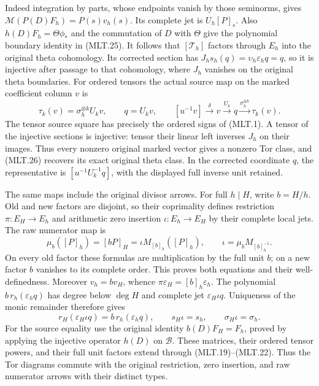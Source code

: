Indeed integration by parts, whose endpoints
vanish by those seminorms, gives
\(\mathcal M(P(D)F_h)=P(s)v_h(s)\).
Its complete jet is \(U_h[P]_s\).
Also \(h(D)F_h=\Theta\phi_*\) and the
commutation of \(D\) with \(\Theta\) give
the polynomial boundary identity in (MLT.25).
It follows that \([\mathcal T_h]\) factors
through \(E_h\) into the original theta
cohomology. Its corrected section has
\(J_hs_h(q)=\upsilon_h\varepsilon_hq=q\),
so it is injective after passage to that
cohomology, where \(J_h\) vanishes on
the original theta boundaries.
For ordered tensors the actual source
map on the marked coefficient column \(v\) is
\[
 \tau_k(v)=\sigma_h^{\otimes k}U_kv,\qquad
 q=U_kv,\qquad
 [u^{-1}v]\xrightarrow{\delta}v
       \xrightarrow{U_k}q
       \xrightarrow{\sigma_h^{\otimes k}}\tau_k(v).
                                                               \tag{MLT.26}
\]
The tensor source square has precisely the
ordered signs of (MLT.1). A tensor of the
injective sections is injective: tensor
their linear left inverses \(J_h\) on
their images. Thus every nonzero original
marked vector gives a nonzero Tor class,
and (MLT.26) recovers its exact original
theta class. In the corrected coordinate
\(q\), the representative is
\([u^{-1}U_k^{-1}q]\), with the displayed
full inverse unit retained.

The same maps include the original divisor
arrows. For full \(h\mid H\), write \(b=H/h\).
Old and new factors are disjoint, so their
coprimality defines restriction \(\pi:E_H\to E_h\)
and arithmetic zero insertion \(\iota:E_h\to E_H\)
by their complete local jets. The raw numerator
map is
\[
 \mu_b([P]_h)=[bP]_H
       =\iota M_{[b]_h}([P]_h),\qquad
 \iota=\mu_bM_{[b]_h^{-1}}.                               \tag{MLT.27}
\]
On every old factor these formulas are
multiplication by the full unit \(b\);
on a new factor \(b\) vanishes to its
complete order. This proves both equations
and their well-definedness.
Moreover \(v_h=bv_H\), whence
\(\pi\varepsilon_H=[b]_h\varepsilon_h\).
The polynomial \(b\,r_h(\varepsilon_hq)\)
has degree below \(\deg H\) and complete
jet \(\varepsilon_H\iota q\). Uniqueness
of the monic remainder therefore gives
\[
 r_H(\varepsilon_H\iota q)=b\,r_h(\varepsilon_hq),
 \qquad s_H\iota=s_h,\qquad \sigma_H\iota=\sigma_h .
                                                               \tag{MLT.28}
\]
For the source equality use the original
identity \(b(D)F_H=F_h\), proved by applying
the injective operator \(h(D)\) on \(\mathscr B\).
These matrices, their ordered tensor powers,
and their full unit factors extend through
(MLT.19)--(MLT.22). Thus the Tor diagrams
commute with the original restriction,
zero insertion, and raw numerator arrows
with their distinct types.

